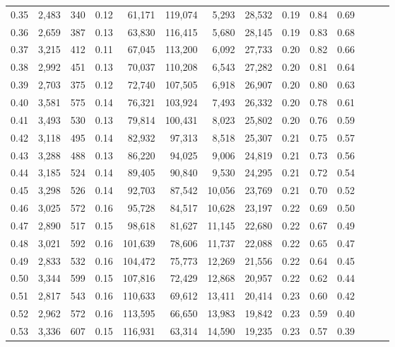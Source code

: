 \begin{tabular}{rrrrrrrrrrrrrr}
0.35 &  2,483 &  340 &  0.12 &   61,171 &  119,074 &   5,293 &  28,532 &  0.19 &  0.84 &      0.69 \\
0.36 &  2,659 &  387 &  0.13 &   63,830 &  116,415 &   5,680 &  28,145 &  0.19 &  0.83 &      0.68 \\
0.37 &  3,215 &  412 &  0.11 &   67,045 &  113,200 &   6,092 &  27,733 &  0.20 &  0.82 &      0.66 \\
0.38 &  2,992 &  451 &  0.13 &   70,037 &  110,208 &   6,543 &  27,282 &  0.20 &  0.81 &      0.64 \\
0.39 &  2,703 &  375 &  0.12 &   72,740 &  107,505 &   6,918 &  26,907 &  0.20 &  0.80 &      0.63 \\
0.40 &  3,581 &  575 &  0.14 &   76,321 &  103,924 &   7,493 &  26,332 &  0.20 &  0.78 &      0.61 \\
0.41 &  3,493 &  530 &  0.13 &   79,814 &  100,431 &   8,023 &  25,802 &  0.20 &  0.76 &      0.59 \\
0.42 &  3,118 &  495 &  0.14 &   82,932 &   97,313 &   8,518 &  25,307 &  0.21 &  0.75 &      0.57 \\
0.43 &  3,288 &  488 &  0.13 &   86,220 &   94,025 &   9,006 &  24,819 &  0.21 &  0.73 &      0.56 \\
0.44 &  3,185 &  524 &  0.14 &   89,405 &   90,840 &   9,530 &  24,295 &  0.21 &  0.72 &      0.54 \\
0.45 &  3,298 &  526 &  0.14 &   92,703 &   87,542 &  10,056 &  23,769 &  0.21 &  0.70 &      0.52 \\
0.46 &  3,025 &  572 &  0.16 &   95,728 &   84,517 &  10,628 &  23,197 &  0.22 &  0.69 &      0.50 \\
0.47 &  2,890 &  517 &  0.15 &   98,618 &   81,627 &  11,145 &  22,680 &  0.22 &  0.67 &      0.49 \\
0.48 &  3,021 &  592 &  0.16 &  101,639 &   78,606 &  11,737 &  22,088 &  0.22 &  0.65 &      0.47 \\
0.49 &  2,833 &  532 &  0.16 &  104,472 &   75,773 &  12,269 &  21,556 &  0.22 &  0.64 &      0.45 \\
0.50 &  3,344 &  599 &  0.15 &  107,816 &   72,429 &  12,868 &  20,957 &  0.22 &  0.62 &      0.44 \\
0.51 &  2,817 &  543 &  0.16 &  110,633 &   69,612 &  13,411 &  20,414 &  0.23 &  0.60 &      0.42 \\
0.52 &  2,962 &  572 &  0.16 &  113,595 &   66,650 &  13,983 &  19,842 &  0.23 &  0.59 &      0.40 \\
0.53 &  3,336 &  607 &  0.15 &  116,931 &   63,314 &  14,590 &  19,235 &  0.23 &  0.57 &      0.39 \\

\end{tabular}
